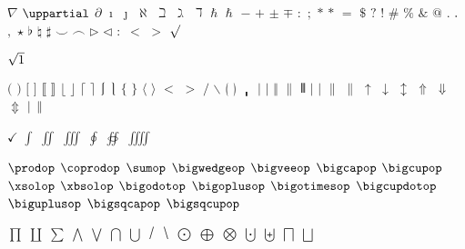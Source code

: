 \documentclass[captions=tableheading]{scrartcl}
\begin{document}

$\nabla$
$\uppartial$
$\partial$
$\imath$
$\jmath$
$\aleph$
$\beth$
$\gimel$
$\daleth$
$\hbar$
$\hslash$
$-$
$+$
$\pm$
$\mp$
$:$
$;$
$*$
$\ast$
$=$
$\mathdollar$
$?$
$!$
$\#$
$\%$
$\&$
$@$
$.$
$\ldotp$
$,$
$\star$
$\flat$
$\natural$
$\sharp$
$\smile$
$\frown$
$\triangleright$
$\triangleleft$
$\colon$
$<$
$>$
$\surd$

$\sqrtsign{1}$

$($
$)$
$[$
$]$
$\lBrack$
\let\dlb\lBrack
$\rBrack$
\let\drb\rBrack
$\lfloor$
$\rfloor$
$\lceil$
$\rceil$
$\lmoustache$
$\rmoustache$
$\lbrace$
$\rbrace$
$\langle$
$\rangle$
$<$
$>$
$/$
$\backslash$
$\lgroup$
$\rgroup$
$\bracevert$
$|$
$\vert$
$\Vert$
$\|$
$\Vvert$
$\lvert$
$\rvert$
$\lVert$
$\rVert$
$\uparrow$
$\downarrow$
$\updownarrow$
$\Uparrow$
$\Downarrow$
$\Updownarrow$
$\arrowvert$
$\Arrowvert$

$\checkmark$
$\int$
$\iint$
$\iiint$
$\oint$
$\oiint$
$\iiiint$

$\prodop$
$\coprodop$
$\sumop$
$\bigwedgeop$
$\bigveeop$
$\bigcapop$
$\bigcupop$
$\xsolop$
$\xbsolop$
$\bigodotop$
$\bigoplusop$
$\bigotimesop$
$\bigcupdotop$
$\biguplusop$
$\bigsqcapop$
$\bigsqcupop$

$\prod$
$\coprod$
$\sum$
$\bigwedge$
$\bigvee$
$\bigcap$
$\bigcup$
$\xsol$
$\xbsol$
$\bigodot$
$\bigoplus$
$\bigotimes$
$\bigcupdot$
$\biguplus$
$\bigsqcap$
$\bigsqcup$

\end{document}
